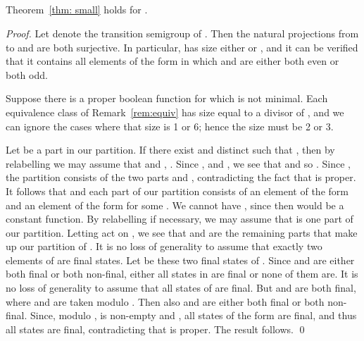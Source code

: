 \documentclass{llncs}
\begin{document}
\subsection{}
\begin{proposition}
Theorem~\ref{thm: small} holds for .
\end{proposition}
\begin{proof}
Let  denote the transition semigroup of .  Then the natural projections from  to  and  are both surjective.  In particular,  has size either  or , and it can be verified that it contains all elements of the form  in which  and  are either both even or both odd.  

Suppose  there is a proper boolean function  for which  is not minimal.  
Each equivalence class of Remark~\ref{rem:equiv} has size equal to a divisor of , and we can ignore the cases where that size is 1 or 6; hence the size must be 2 or 3.    

Let  be a part in our partition.  
If there exist  and distinct  such that , then by relabelling we may assume that  and , .  
Since , and , we see that  and so .  
Since ,  the partition consists of the two parts  and , contradicting the fact that  is proper.  
It follows that  and each part of our partition consists of an element of the form  and an element of the form  for some .  We cannot have , since then   would be a constant function.  By relabelling if necessary, we may assume that  is one part of our partition.  Letting  act on , we see that
 and  are the remaining parts that make up our partition of .  It is no loss of generality to assume that exactly two elements of  are final states.  Let  be these two final states of . Since  and  are either both final or both non-final, either all states in  are final or none of them are.  
It is no loss of generality to assume that all states of  are final.  
But   and  are both final, where  and  are taken modulo .  Then also  and  are either both final or both non-final.  Since, modulo ,  is non-empty and ,  all states of the form  are final, and thus all states are final, contradicting that  is proper.  The result follows.
\qed
\end{proof}
\end{document}
